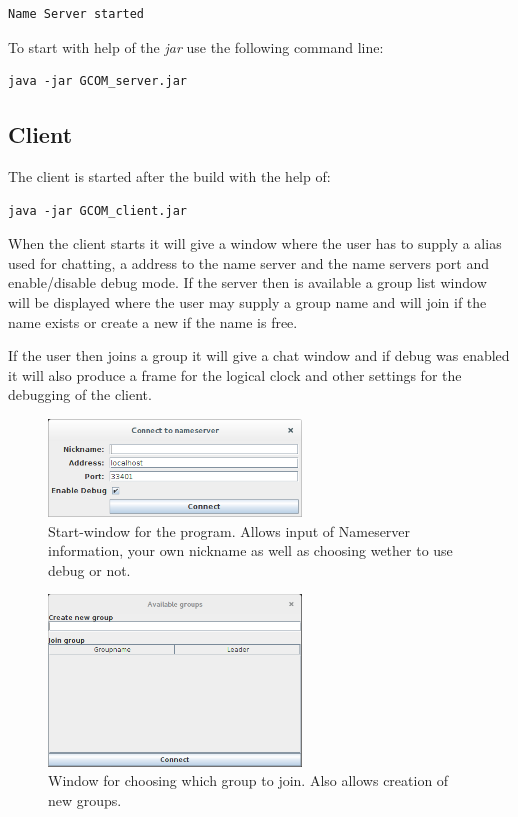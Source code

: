 \begin{verbatim}
Name Server started
\end{verbatim}

To start with help of the \textit{jar} use the following command line:
\begin{verbatim}
java -jar GCOM_server.jar
\end{verbatim}


\subsection{Client}
The client is started after the build with the help of:
\begin{verbatim}
java -jar GCOM_client.jar
\end{verbatim}

When the client starts it will give a window where the user has to supply a alias used for chatting, a address to the name server and the name servers port and enable/disable debug mode.
If the server then is available a group list window will be displayed where the user may supply a group name and will join if the name exists or create a new if the name is free. 

If the user then joins a group it will give a chat window and if debug was enabled it will also produce a frame for the logical clock and other settings for the debugging of the client.

\begin{figure}[h!]
\centering
\includegraphics[width=0.6\textwidth]{Pictures/login}
\caption{Start-window for the program. Allows input of Nameserver information, your own nickname as well as choosing wether to use debug or not. }
\end{figure}

\begin{figure}[h!]
\centering
\includegraphics[width=0.6\textwidth]{Pictures/groupChoose}
\caption{Window for choosing which group to join. Also allows creation of new groups. }
\end{figure}

